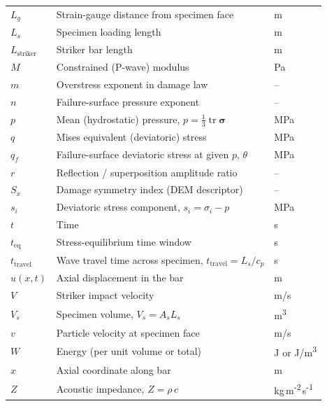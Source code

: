 \documentclass[11pt,a4paper,openany]{book}
\theoremstyle{handbook}
\newcommand{\sig}{\sigma}
\newcommand{\As}{A_s}
\newcommand{\Ls}{L_s}
\DeclareMathOperator{\tr}{tr}
\begin{document}
\begin{longtable}{@{}p{3.2cm}p{10cm}p{2cm}@{}}
$L_g$ & Strain-gauge distance from specimen face & m \\
$\Ls$ & Specimen loading length & m \\
$L_{\text{striker}}$ & Striker bar length & m \\
$M$ & Constrained (P-wave) modulus & Pa \\
$m$ & Overstress exponent in damage law & -- \\
$n$ & Failure-surface pressure exponent & -- \\
$p$ & Mean (hydrostatic) pressure, $p=\tfrac{1}{3}\tr\bm\sig$ & MPa \\
$q$ & Mises equivalent (deviatoric) stress & MPa \\
$q_f$ & Failure-surface deviatoric stress at given $p$, $\theta$ & MPa \\
$r$ & Reflection / superposition amplitude ratio & -- \\
$S_x$ & Damage symmetry index (DEM descriptor) & -- \\
$s_i$ & Deviatoric stress component, $s_i=\sig_i-p$ & MPa \\
$t$ & Time & s \\
$t_{\text{eq}}$ & Stress-equilibrium time window & s \\
$t_{\text{travel}}$ & Wave travel time across specimen, $t_{\text{travel}}=\Ls/c_p$ & s \\
$u(x,t)$ & Axial displacement in the bar & m \\
$V$ & Striker impact velocity & m/s \\
$V_s$ & Specimen volume, $V_s=\As\Ls$ & m\textsuperscript{3} \\
$v$ & Particle velocity at specimen face & m/s \\
$W$ & Energy (per unit volume or total) & J or J/m\textsuperscript{3} \\
$x$ & Axial coordinate along bar & m \\
$Z$ & Acoustic impedance, $Z=\rho\,c$ & kg\,m\textsuperscript{-2}\,s\textsuperscript{-1} \\
\bottomrule
\end{longtable}
\end{document}
